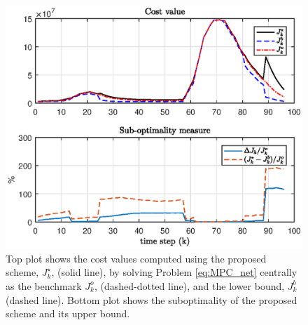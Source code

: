 \fi 
\begin{figure}
	\centering
	\includegraphics[scale=0.6]{img/delta_J2.eps}
	\caption{Top plot shows the cost values computed using the proposed scheme, $J^{\star}_k$, (solid line), by solving Problem \eqref{eq:MPC_net} centrally as the benchmark $J^{o}_k$, (dashed-dotted line), and the lower bound, $J^{b}_k$ (dashed line). Bottom plot shows the suboptimality of the proposed scheme and its upper bound.
	}
	\label{fig:deltaJ}
\end{figure}
